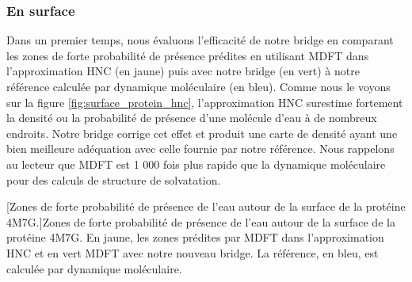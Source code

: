 \subsubsection{En surface}
Dans un premier temps, nous évaluons l'efficacité de notre bridge en comparant les zones de forte probabilité de présence prédites en utilisant MDFT dans l'approximation HNC (en jaune) puis avec notre bridge (en vert) à notre référence calculée par dynamique moléculaire (en bleu). Comme nous le voyons sur la figure \ref{fig:surface_protein_hnc}, l'approximation HNC surestime fortement la densité ou la probabilité de présence d'une molécule d'eau à de nombreux endroits. Notre bridge corrige cet effet et produit une carte de densité ayant une bien meilleure adéquation avec celle fournie par notre référence. Nous rappelons au lecteur que MDFT est 1 000 fois plus rapide que la dynamique moléculaire pour des calculs de structure de solvatation.







\begin{center}
    \captionsetup{type=figure}
	[Zones de forte probabilité de présence de l'eau autour de la surface de la protéine 4M7G.]{Zones de forte probabilité de présence de l'eau autour de la surface de la protéine 4M7G. En jaune, les zones prédites par MDFT dans l'approximation HNC et en vert MDFT avec notre nouveau bridge. La référence, en bleu, est calculée par dynamique moléculaire.}
      \label{fig:surface_protein_hnc}
\end{center}


